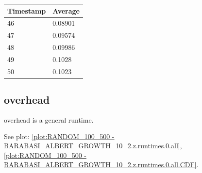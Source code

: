 \begin{tabular}{|l||l|}
\hline
	\textbf{Timestamp} & \textbf{Average} \\ \hline
	46 & 0.08901 \\ \hline
	47 & 0.09574 \\ \hline
	48 & 0.09986 \\ \hline
	49 & 0.1028 \\ \hline
	50 & 0.1023 \\ \hline
\end{tabular}

\subsection{overhead}
overhead is a general runtime.

See plot: \ref{plot:RANDOM_100_500 - BARABASI_ALBERT_GROWTH_10_2.z.runtimes.0.all}, \ref{plot:RANDOM_100_500 - BARABASI_ALBERT_GROWTH_10_2.z.runtimes.0.all.CDF}.

